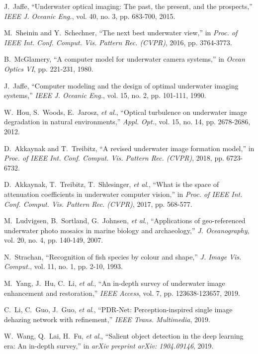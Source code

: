 \documentclass[journal]{IEEEtran}
\newcommand{\etal}{\textit{et al}.}
\begin{document}
\begin{thebibliography}{20}

J.~Jaffe, ``Underwater optical imaging: The past, the present, and the prospects,'' \emph{IEEE J. Oceanic Eng.}, vol. 40, no. 3, pp. 683-700, 2015.

M.~Sheinin and Y.~Schechner, ``The next best underwater view,'' in \emph{Proc. of IEEE Int. Conf. Comput. Vis. Pattern Rec. (CVPR)}, 2016, pp. 3764-3773.

B.~McGlamery, ``A computer model for underwater camera systems,'' in \emph{Ocean Optics VI}, pp. 221-231, 1980.

J.~Jaffe, ``Computer modeling and the design of optimal underwater imaging systems,'' \emph{IEEE J. Oceanic Eng.}, vol. 15, no. 2, pp. 101-111, 1990.

W.~Hou, S.~Woods, E.~Jarosz, \etal, ``Optical turbulence on underwater image degradation in natural environments,'' \emph{Appl. Opt.}, vol. 15, no. 14, pp. 2678-2686, 2012.

D.~Akkaynak and T.~Treibitz, ``A revised underwater image formation model,'' in \emph{Proc. of IEEE Int. Conf. Comput. Vis. Pattern Rec. (CVPR)}, 2018, pp. 6723-6732.


D.~Akkaynak, T.~Treibitz, T.~Shlesinger, \etal, ``What is the space of attenuation coefficients in underwater computer vision,'' in \emph{Proc. of IEEE Int. Conf. Comput. Vis. Pattern Rec. (CVPR)}, 2017, pp. 568-577.

M.~Ludvigsen, B.~Sortland, G.~Johnsen, \etal, ``Applications of geo-referenced underwater photo mosaics in marine biology and archaeology,'' \emph{J. Oceanography}, vol. 20, no. 4, pp. 140-149, 2007.

N.~Strachan, ``Recognition of fish species by colour and shape,'' \emph{J. Image Vis. Comput.}, vol. 11, no. 1, pp. 2-10, 1993.

M.~Yang, J.~Hu, C.~Li, \etal, ``An in-depth survey of underwater image enhancement and restoration,'' \emph{IEEE Access}, vol. 7, pp. 123638-123657, 2019.


C.~Li, C.~Guo, J.~Guo, \etal, ``PDR-Net: Perception-inspired single image dehazing network with refinement,'' \emph{IEEE Trans. Multimedia}, 2019.

W.~Wang, Q.~Lai, H.~Fu, \etal, ``Salient object detection in the deep learning era: An in-depth survey,'' in \emph{arXiv preprint arXiv: 1904.09146}, 2019.


\end{thebibliography}
\end{document}
